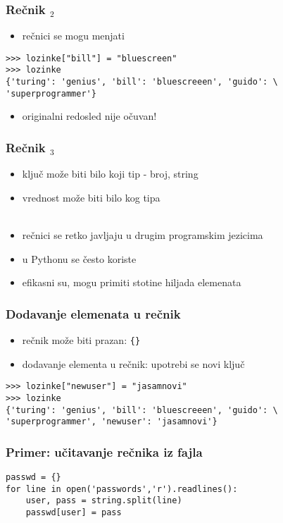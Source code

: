 \documentclass[utf8,compress]{beamer}
\begin{document}
\begin{frame}[fragile]
  \frametitle{Rečnik $_2$}
  \begin{itemize}
    \item rečnici se mogu menjati
  \end{itemize}
\begin{verbatim}
>>> lozinke["bill"] = "bluescreen"
>>> lozinke
{'turing': 'genius', 'bill': 'bluescreeen', 'guido': \
'superprogrammer'}
\end{verbatim}
  \begin{itemize}
    \item originalni redosled nije očuvan!
  \end{itemize}
\end{frame}

\begin{frame}[fragile]
  \frametitle{Rečnik $_3$}
  \begin{itemize}
    \item ključ može biti bilo koji  tip - broj, string
    \item vrednost može biti bilo kog tipa \\ \ \\
    \item rečnici se retko javljaju u drugim programskim jezicima
    \item u Pythonu se često koriste
    \item efikasni su, mogu primiti stotine hiljada elemenata
  \end{itemize}
\end{frame}

\begin{frame}[fragile]
  \frametitle{Dodavanje elemenata u rečnik}
  \begin{itemize}
    \item rečnik može biti prazan: \texttt{\{\}}
    \item dodavanje elementa u rečnik: upotrebi se novi ključ
  \end{itemize}
\begin{verbatim}
>>> lozinke["newuser"] = "jasamnovi"
>>> lozinke
{'turing': 'genius', 'bill': 'bluescreeen', 'guido': \
'superprogrammer', 'newuser': 'jasamnovi'}
\end{verbatim}
\end{frame}

\begin{frame}[fragile]
  \frametitle{Primer: učitavanje rečnika iz fajla}
\begin{verbatim}
passwd = {}
for line in open('passwords','r').readlines():
    user, pass = string.split(line)
    passwd[user] = pass
\end{verbatim}
\end{frame}
\end{document}
